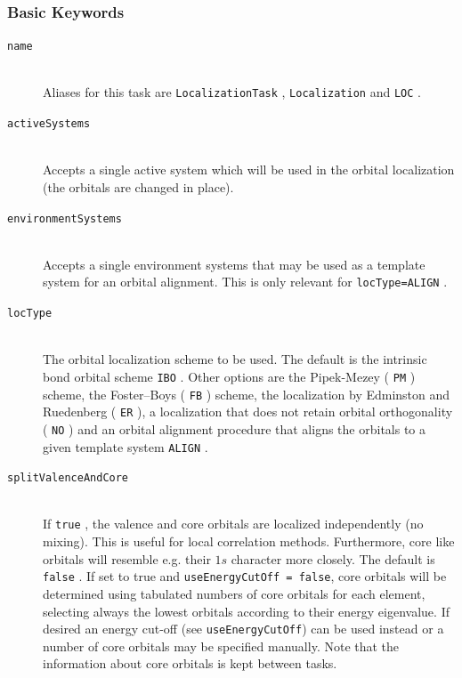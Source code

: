 \documentclass[bibliography=totocnumbered,a4paper,10pt,oneside]{scrbook}
\newcommand{\ttt}[1]{%
  \begingroup\setlength{\fboxsep}{1pt}%
  \colorbox{serenity-green!30}{\texttt{\hspace*{2pt}\vphantom{(g}#1\hspace*{2pt}}}%
  \endgroup
}
\begin{document}
\subsubsection{Basic Keywords}
\begin{description}
 \item [\texttt{name}]\hfill \\
   Aliases for this task are \ttt{LocalizationTask}, \ttt{Localization} and \ttt{LOC}.
 \item [\texttt{activeSystems}]\hfill \\
   Accepts a single active system which will be used in the orbital localization
   (the orbitals are changed in place).
 \item [\texttt{environmentSystems}]\hfill \\
   Accepts a single environment systems that may be used as a template system for an orbital alignment.
   This is only relevant for \ttt{locType=ALIGN}.
 \item [\texttt{locType}]\hfill \\
   The orbital localization scheme to be used. The default is the intrinsic bond orbital scheme \ttt{IBO}.
   Other options are the  Pipek-Mezey (\ttt{PM}) scheme, the Foster--Boys (\ttt{FB}) scheme, the localization
   by Edminston and Ruedenberg (\ttt{ER}), a localization that does not retain orbital orthogonality
   (\ttt{NO}) and an orbital alignment procedure that aligns the orbitals to a given template system \ttt{ALIGN}\cite{Bensberg2020}.
 \item [\texttt{splitValenceAndCore}]\hfill \\
   If \ttt{true}, the valence and core orbitals are localized independently (no mixing). This is useful
   for local correlation methods. Furthermore, core like orbitals will resemble e.g. their $1s$ character
   more closely. The default is \ttt{false}. If set to true and \texttt{useEnergyCutOff = false}, core
   orbitals will be determined using tabulated  numbers of core orbitals for each element, selecting always
   the lowest orbitals according to their energy eigenvalue. If desired an energy cut-off
   (see \texttt{useEnergyCutOff}) can be used instead or a number of core orbitals may be specified manually.
   Note that the information about core orbitals is kept between tasks.
\end{description}
\end{document}
